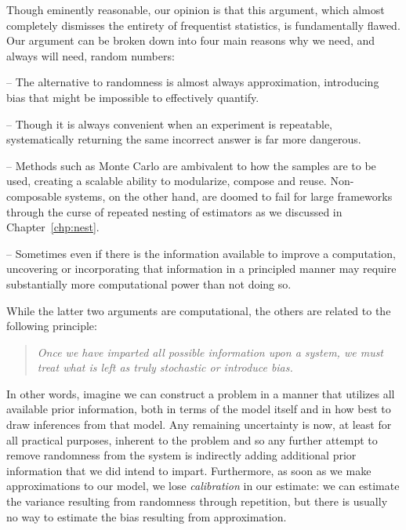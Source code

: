 Though eminently reasonable, our opinion is that this argument, which almost completely dismisses the entirety
of frequentist statistics, is fundamentally flawed.  Our argument can be broken down into four main reasons 
why we need, and always will need, random numbers:
\begin{description}[align=left]
	\vspace{-8pt}
	\setlength\itemsep{-0.1em}
	\item[Honesty and reliability] -- The alternative to randomness is almost always approximation, introducing bias 
	that might be impossible to effectively quantify.
	\item[Lack of repeatability] -- Though it is always convenient when an experiment is repeatable, systematically 
	returning the same incorrect answer is far more dangerous.
	\item[Composability] -- Methods such as Monte Carlo are ambivalent to how the samples are to be used, creating 
	a scalable ability to modularize, compose and reuse.  Non-composable systems, on the other hand, are doomed to fail
	for large frameworks through the curse of repeated nesting of estimators as we discussed in Chapter~\ref{chp:nest}.
	\item[Speed and simplicity] -- Sometimes even if there is the information available to improve a computation, 
	uncovering or incorporating that information in a principled manner may require substantially more computational 
	power than not doing so.
	\vspace{-10pt}
\end{description}
While the latter two arguments are computational, the others are related to the following principle:
\begin{quote}
	\vspace{-4pt}
	\emph{Once we have imparted all possible information upon a system, we must treat what is left as truly 
		stochastic or introduce bias.}
	\vspace{-8pt}
\end{quote}
In other words, imagine we can construct a problem in a manner that utilizes all available prior information,
both in terms of the model itself and in how best to draw inferences from that model.
Any remaining uncertainty is now, at least for all practical purposes, inherent to the problem and so any
further attempt to remove randomness from the system is indirectly adding additional prior information  that we
did intend to impart.  Furthermore, as soon as we make approximations to our model,
we lose \emph{calibration} in our estimate: we can estimate the variance
resulting from randomness through repetition, but there is usually no way to estimate the bias
resulting from approximation.

